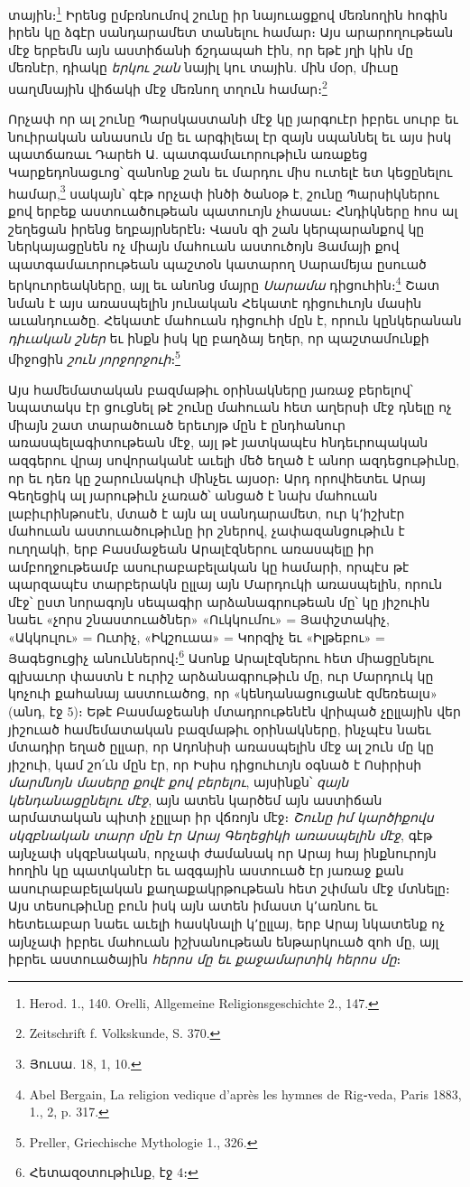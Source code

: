 \documentclass{article}
\begin{document}
{տային։\footnote{Herod. 1., 140. Orelli, Allgemeine Religionsgeschichte 2., 147.} Իրենց ըմբռնումով շունը իր նայուացքով մեռնողին հոգին իրեն կը ձգէր սանդարամետ տանելու համար։ Այս արարողութեան մէջ երբեմն այն աստիճանի ճշդապահ էին, որ եթէ յղի կին մը մեռնէր, դիակը \emph{երկու շան} նայիլ կու տային. մին մօր, միւսը սաղմնային վիճակի մէջ մեռնող տղուն համար։\footnote{Zeitschrift f. Volkskunde, S. 370.}

Որչափ որ ալ շունը Պարսկաստանի մէջ կը յարգուէր իբրեւ սուրբ եւ նուիրական անասուն մը եւ արգիլեալ էր զայն սպաննել եւ այս իսկ պատճառաւ Դարեհ Ա. պատգամաւորութիւն առաքեց Կարքեդոնացւոց՝ զանոնք շան եւ մարդու միս ուտելէ ետ կեցընելու համար,\footnote{Յուսա. 18, 1, 10.} սակայն՝ գէթ որչափ ինծի ծանօթ է, շունը Պարսիկներու քով երբեք աստուածութեան պատուոյն չհասաւ։ Հնդիկները հոս ալ շեղեցան իրենց եղբայրներէն։ Վասն զի շան կերպարանքով կը ներկայացընեն ոչ միայն մահուան աստուծոյն Յամայի քով պատգամաւորութեան պաշտօն կատարող Սարամեյա ըսուած երկուորեակները, այլ եւ անոնց մայրը \emph{Սարամա} դիցուհին։\footnote{Abel Bergain, La religion vedique d'après les hymnes de Rig֊veda, Paris 1883, 1., 2, p. 317.} Շատ նման է այս առասպելին յունական Հեկատէ դիցուհւոյն մասին աւանդուածը. Հեկատէ մահուան դիցուհի մըն է, որուն կընկերանան \emph{դիւական շներ} եւ ինքն իսկ կը բաղձայ եղեր, որ պաշտամունքի միջոցին \emph{շուն յորջորջուի}։\footnote{Preller, Griechische Mythologie 1., 326.}

Այս համեմատական բազմաթիւ օրինակները յառաջ բերելով՝ նպատակս էր ցուցնել թէ շունը մահուան հետ աղերսի մէջ դնելը ոչ միայն շատ տարածուած երեւոյթ մըն է ընդհանուր առասպելագիտութեան մէջ, այլ թէ յատկապէս հնդեւրոպական ազգերու վրայ սովորականէ աւելի մեծ եղած է անոր ազդեցութիւնը, որ եւ դեռ կը շարունակուի մինչեւ այսօր։ Արդ որովհետեւ Արայ Գեղեցիկ ալ յարութիւն չառած՝ անցած է նախ մահուան լաբիւրինթոսէն, մտած է այն ալ սանդարամետ, ուր կ՚իշխէր մահուան աստուածութիւնը իր շներով, չափազանցութիւն է ուղղակի, երբ Բասմաջեան Արալէզներու առասպելը իր ամբողջութեամբ ասուրաբաբելական կը համարի, որպէս թէ պարզապէս տարբերակն ըլլայ այն Մարդուկի առասպելին, որուն մէջ՝ ըստ նորագոյն սեպագիր արձանագրութեան մը՝ կը յիշուին նաեւ «չորս շնաստուածներ» «Ուկկումու» = Յափշտակիչ, «Ակկուլու» = Ուտիչ, «Իկշուաա» = Կորզիչ եւ «Իլթեբու» = Յագեցուցիչ անուններով։\footnote{Հետազօտութիւնք, էջ 4։} Ասոնք Արալէզներու հետ միացընելու գլխաւոր փաստն է ուրիշ արձանագրութիւն մը, ուր Մարդուկ կը կոչուի քահանայ աստուածոց, որ «կենդանացուցանէ զմեռեալս» (անդ, էջ 5)։ Եթէ Բասմաջեանի մտադրութենէն վրիպած չըլլային վեր յիշուած համեմատական բազմաթիւ օրինակները, ինչպէս նաեւ մտադիր եղած ըլլար, որ Ադոնիսի առասպելին մէջ ալ շուն մը կը յիշուի, կամ շո՛ւն մըն էր, որ Իսիս դիցուհւոյն օգնած է Ոսիրիսի \emph{մարմնոյն մասերը քովէ քով բերելու}, այսինքն՝ \emph{զայն կենդանացընելու մէջ}, այն ատեն կարծեմ այն աստիճան արմատական պիտի չըլլար իր վճռոյն մէջ։ \emph{Շունը իմ կարծիքովս սկզբնական տարր մըն էր Արայ Գեղեցիկի առասպելին մէջ}, գէթ այնչափ սկզբնական, որչափ ժամանակ որ Արայ հայ ինքնուրոյն հողին կը պատկանէր եւ ազգային աստուած էր յառաջ քան ասուրաբաբելական քաղաքակրթութեան հետ շփման մէջ մտնելը։ Այս տեսութիւնը բուն իսկ այն ատեն իմաստ կ՚առնու եւ հետեւաբար նաեւ աւելի հասկնալի կ՚ըլլայ, երբ Արայ նկատենք ոչ այնչափ իբրեւ մահուան իշխանութեան ենթարկուած զոհ մը, այլ իբրեւ աստուածային \emph{հերոս մը եւ քաջամարտիկ հերոս մը}։

}
\end{document}
